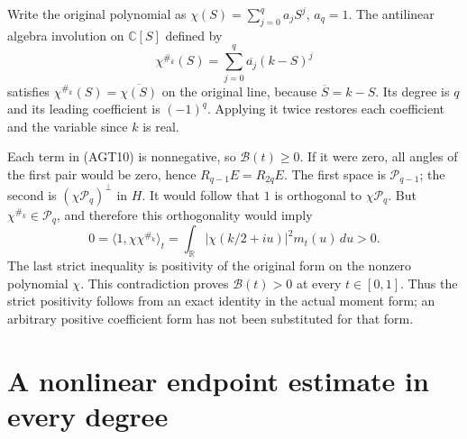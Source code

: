 \documentclass{article}
\newcommand{\C}{\mathbb C}
\newcommand{\cP}{\mathcal P}
\begin{document}
Write the original polynomial as $\chi(S)=\sum_{j=0}^qa_jS^j$,
$a_q=1$. The antilinear algebra involution on $\C[S]$ defined by
\[
 \chi^{\#_k}(S)=\sum_{j=0}^q\overline{a_j}(k-S)^j
 \tag{AGT12}
\]
satisfies $\chi^{\#_k}(S)=\overline{\chi(S)}$ on the original
line, because $\overline S=k-S$. Its degree is $q$ and its
leading coefficient is $(-1)^q$. Applying it twice restores
each coefficient and the variable since $k$ is real.

Each term in (AGT10) is nonnegative, so $\mathcal B(t)\ge0$.
If it were zero, all angles of the first pair would be zero,
hence $R_{q-1}E=R_{2q}E$. The first space is $\cP_{q-1}$;
the second is $(\chi\cP_q)^\perp$ in $H$.
It would follow that $1$ is orthogonal to $\chi\cP_q$.
But $\chi^{\#_k}\in\cP_q$, and therefore this orthogonality
would imply
\[
 0=\langle1,\chi\chi^{\#_k}\rangle_t
   =\int_{\mathbb R}|\chi(k/2+iu)|^2m_t(u)\,du>0.
 \tag{AGT13}
\]
The last strict inequality is positivity of the original form
on the nonzero polynomial $\chi$. This contradiction proves
$\mathcal B(t)>0$ at every $t\in[0,1]$. Thus the strict
positivity follows from an exact identity in the actual
moment form; an arbitrary positive coefficient form has not
been substituted for that form.

\section{A nonlinear endpoint estimate in every degree}
\end{document}
